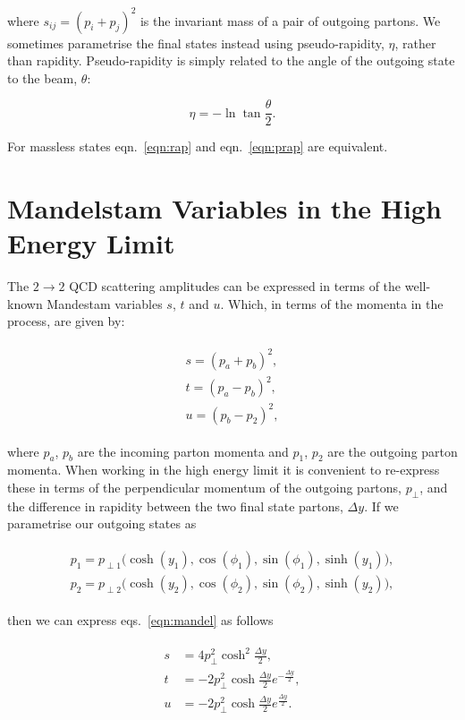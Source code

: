 	where $s_{ij} = (p_i + p_j)^2$ is the invariant mass of a pair of outgoing partons.  We sometimes
	parametrise the final states instead using pseudo-rapidity, $\eta$, rather than rapidity. Pseudo-rapidity
	is simply related to the angle of the outgoing state to the beam, $\theta$:

	\begin{equation}
		\eta = -\ln\tan\frac{\theta}{2}.
		\label{eqn:prap}
	\end{equation}

	For massless states eqn.~\eqref{eqn:rap} and eqn.~\eqref{eqn:prap} are equivalent.

\section{Mandelstam Variables in the High Energy Limit}
	\label{sub:MandelstamVariables}

	The $2\rightarrow 2$ QCD scattering amplitudes can be expressed in terms of the well-known Mandestam
	variables $s$, $t$ and $u$.  Which, in terms of the momenta in the process, are given by:

	\begin{align}
	\begin{split}
		s = (p_a + p_b)^2, \\
		t = (p_a - p_b)^2, \\
		u = (p_b - p_2)^2,
		\label{eqn:mandel}
	\end{split}
	\end{align}

	where $p_a$, $p_b$ are the incoming parton momenta and $p_1$, $p_2$ are the outgoing parton momenta.
	When working in the high energy limit it is convenient to re-express these in terms of the
	perpendicular momentum of the outgoing partons, $p_\perp$, and the difference in rapidity
	between the two final state partons, $\Delta y$.  If we parametrise our outgoing states as

	\begin{align}
	\begin{split}
		p_1 = p_{\perp1}\big(\cosh (y_1), \cos(\phi_1), \sin(\phi_1), \sinh (y_1)\big),\\
		p_2 = p_{\perp2}\big(\cosh (y_2), \cos(\phi_2), \sin(\phi_2), \sinh (y_2)\big),
	\end{split}
	\end{align}

	then we can express eqs.~\eqref{eqn:mandel} as follows

	\begin{align}
	\begin{split}
		s &=  4p_\perp^2 \cosh^2\frac{\Delta y}{2}, \\
		t &= -2p_\perp^2 \cosh  \frac{\Delta y}{2}e^{-\frac{\Delta y}{2}}, \\
		u &= -2p_\perp^2 \cosh  \frac{\Delta y}{2}e^{ \frac{\Delta y}{2}}.
	\end{split}
	\end{align}

